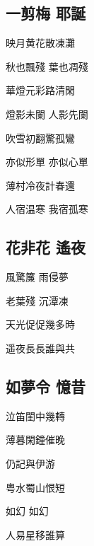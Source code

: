 \documentclass[a4j,12pt]{ltjtarticle}
\begin{document}
\begin{center}
	\begin{flushleft}
		\section{一剪梅 耶誕} 
	\end{flushleft}	
	
	
	\vfill
	\LARGE 映月黄花散凍灘 \par
	秋也飄殘  葉也凋殘 \par
	華燈元彩路清閑 \par
	燈影未闌  人影先闌 \par
	吹雪初翻驚孤鸞 \par
	亦似形單 亦似心單 \par
	薄村冷夜計春還 \par
	人宿温寒 我宿孤寒 \par
	
	
	\vspace{2cm} %
	\vfill
	
	
	\newpage
	
	\begin{flushleft}
		\section{花非花 遙夜} 
	\end{flushleft}	
	
	\vfill
	\LARGE 風驚簾    雨侵夢\par
	老葉殘    沉潭凍\par
	天光促促幾多時 \par
	遥夜長長誰與共 \par

	\vspace{0.5cm} %
	\vfill
	
	
	\newpage 
	
	
	\begin{flushleft}
		\section{如夢令 憶昔} 
	\end{flushleft}	
	
	\vfill
	\LARGE 泣笛閨中幾轉\par
	薄暮閑鐘催晚\par
	仍記與伊游\par 
	粤水蜀山恨短 \par
	如幻    如幻\par
	人易星移誰算\par
	\vspace{1.5cm} %
	\vfill
	

\end{center}
\end{document}
